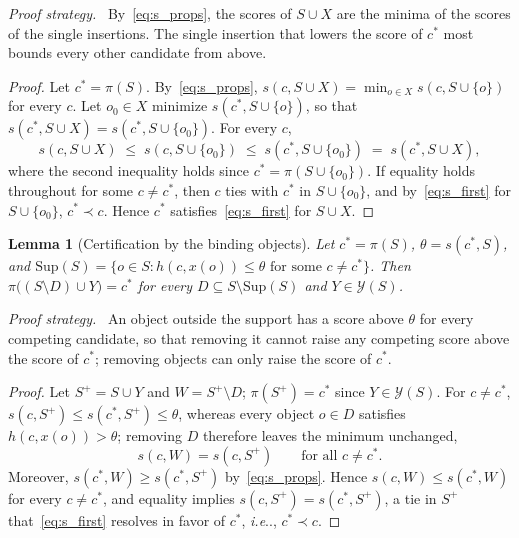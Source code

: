 \documentclass[10pt,letterpaper]{article}
\makeatletter
\DeclareRobustCommand\onedot{\futurelet\@let@token\@onedot}
\def\@onedot{\ifx\@let@token.\else.\null\fi\xspace}
\def\ie{\emph{i.e}\onedot} \def\Ie{\emph{I.e}\onedot}
\newcommand{\Sup}{\mathrm{Sup}}
\newcommand{\policy}{\pi}
\newtheorem{lemma}{Lemma}
\theoremstyle{remark}
\theoremstyle{plain}
\theoremstyle{definition}
\newenvironment{strategy}{\par\noindent\textit{Proof strategy.}\ }{\par}
\makeatother
\begin{document}
\begin{strategy}
By~\cref{eq:s_props}, the scores of $S\cup X$ are the minima of the scores of the single insertions. The single insertion that lowers the score of $c^\ast$ most bounds every other candidate from above.
\end{strategy}

\begin{proof}
Let $c^\ast=\policy(S)$. By~\cref{eq:s_props}, $s(c,S\cup X)=\min_{o\in X}s(c,S\cup\{o\})$ for every $c$.
Let $o_0\in X$ minimize $s(c^\ast,S\cup\{o\})$, so that $s(c^\ast,S\cup X)=s(c^\ast,S\cup\{o_0\})$.
For every $c$,
\begin{equation}
s(c,S\cup X)\;\le\; s(c,S\cup\{o_0\})\;\le\; s(c^\ast,S\cup\{o_0\})\;=\;s(c^\ast,S\cup X),
\end{equation}
where the second inequality holds since $c^\ast=\policy(S\cup\{o_0\})$.
If equality holds throughout for some $c\neq c^\ast$, then $c$ ties with $c^\ast$ in $S\cup\{o_0\}$, and by~\cref{eq:s_first} for $S\cup\{o_0\}$, $c^\ast\prec c$.
Hence $c^\ast$ satisfies~\cref{eq:s_first} for $S\cup X$.
\end{proof}

\begin{lemma}[Certification by the binding objects]
\label{lem:binding}
Let $c^\ast=\policy(S)$, $\theta=s(c^\ast,S)$, and $\Sup(S)=\{o\in S:h(c,x(o))\le\theta\text{ for some }c\neq c^\ast\}$.
Then $\policy\big((S\setminus D)\cup Y\big)=c^\ast$ for every $D\subseteq S\setminus\Sup(S)$ and $Y\in\mathcal{Y}(S)$.
\end{lemma}

\begin{strategy}
An object outside the support has a score above $\theta$ for every competing candidate, so that removing it cannot raise any competing score above the score of $c^\ast$; removing objects can only raise the score of $c^\ast$.
\end{strategy}

\begin{proof}
Let $S^+=S\cup Y$ and $W=S^+\setminus D$; $\policy(S^+)=c^\ast$ since $Y\in\mathcal{Y}(S)$.
For $c\neq c^\ast$, $s(c,S^+)\le s(c^\ast,S^+)\le\theta$, whereas every object $o\in D$ satisfies $h(c,x(o))>\theta$; removing $D$ therefore leaves the minimum unchanged,
\begin{equation}
s(c,W)=s(c,S^+)\qquad\text{for all }c\neq c^\ast .
\end{equation}
Moreover, $s(c^\ast,W)\ge s(c^\ast,S^+)$ by~\cref{eq:s_props}.
Hence $s(c,W)\le s(c^\ast,W)$ for every $c\neq c^\ast$, and equality implies $s(c,S^+)=s(c^\ast,S^+)$, a tie in $S^+$ that~\cref{eq:s_first} resolves in favor of $c^\ast$, \ie, $c^\ast\prec c$.
\end{proof}
\end{document}
